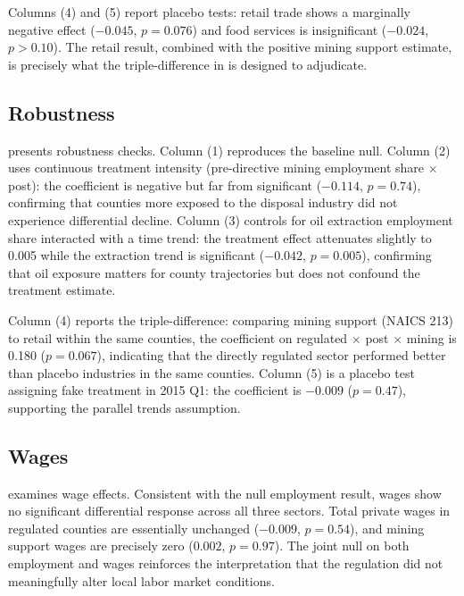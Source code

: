 \documentclass[12pt]{article}
\begin{document}
Columns (4) and (5) report placebo tests: retail trade shows a marginally negative effect ($-0.045$, $p = 0.076$) and food services is insignificant ($-0.024$, $p > 0.10$). The retail result, combined with the positive mining support estimate, is precisely what the triple-difference in  is designed to adjudicate.

\subsection{Robustness}



 presents robustness checks. Column (1) reproduces the baseline null. Column (2) uses continuous treatment intensity (pre-directive mining employment share $\times$ post): the coefficient is negative but far from significant ($-0.114$, $p = 0.74$), confirming that counties more exposed to the disposal industry did not experience differential decline. Column (3) controls for oil extraction employment share interacted with a time trend: the treatment effect attenuates slightly to 0.005 while the extraction trend is significant ($-0.042$, $p = 0.005$), confirming that oil exposure matters for county trajectories but does not confound the treatment estimate.

Column (4) reports the triple-difference: comparing mining support (NAICS 213) to retail within the same counties, the coefficient on regulated $\times$ post $\times$ mining is 0.180 ($p = 0.067$), indicating that the directly regulated sector performed better than placebo industries in the same counties. Column (5) is a placebo test assigning fake treatment in 2015 Q1: the coefficient is $-0.009$ ($p = 0.47$), supporting the parallel trends assumption.

\subsection{Wages}



 examines wage effects. Consistent with the null employment result, wages show no significant differential response across all three sectors. Total private wages in regulated counties are essentially unchanged ($-0.009$, $p = 0.54$), and mining support wages are precisely zero ($0.002$, $p = 0.97$). The joint null on both employment and wages reinforces the interpretation that the regulation did not meaningfully alter local labor market conditions.
\end{document}
